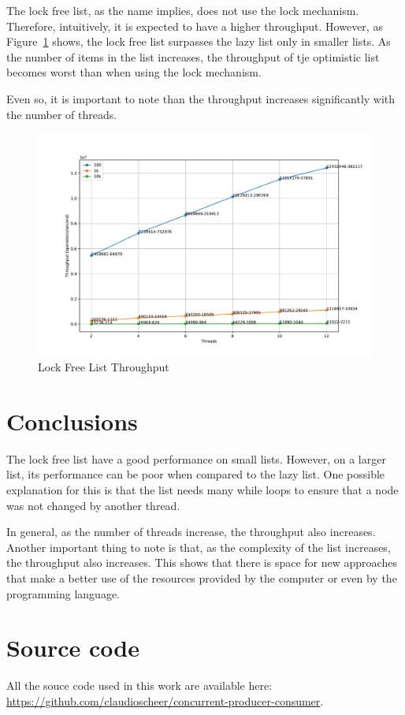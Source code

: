 \documentclass{article}
\begin{document}
The lock free list, as the name implies, does not use the lock mechanism. Therefore, intuitively, it is expected to have a higher throughput. However, as Figure~\ref{fig:lock-free-throughput} shows, the lock free list surpasses the lazy list only in smaller lists. As the number of items in the list increases, the throughput of tje optimistic list becomes worst than when using the lock mechanism.

Even so, it is important to note than the throughput increases significantly with the number of threads.

\begin{figure}[H]
    \centering
    \includegraphics[width=\textwidth]{../test/plots/LockFreeListThroughput.pdf}
    \caption{Lock Free List Throughput}
    \label{fig:lock-free-throughput}
\end{figure}


\section{Conclusions}

The lock free list have a good performance on small lists. However, on a larger list, its performance can be poor when compared to the lazy list. One possible explanation for this is that the list needs many while loops to ensure that a node was not changed by another thread.

In general, as the number of threads increase, the throughput also increases. Another important thing to note is that, as the complexity of the list increases, the throughput also increases. This shows that there is space for new approaches that make a better use of the resources provided by the computer or even by the programming language.


\section{Source code} \label{sec:source-code}

All the souce code used in this work are available here: \url{https://github.com/claudioscheer/concurrent-producer-consumer}.




\end{document}
